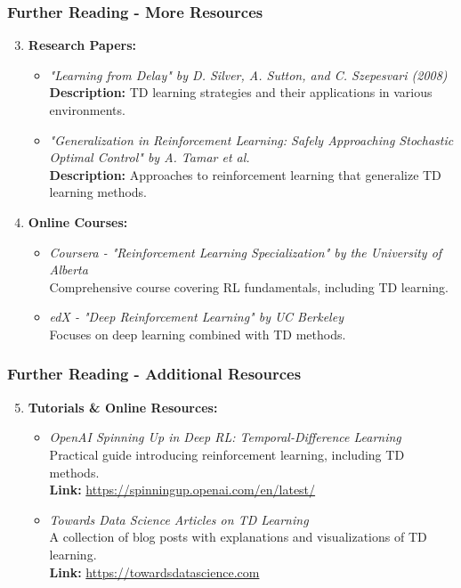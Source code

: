 \documentclass[aspectratio=169]{beamer}
\begin{document}
\begin{frame}[fragile]
    \frametitle{Further Reading - More Resources}
    \begin{enumerate}
        \setcounter{enumi}{2}
        \item \textbf{Research Papers:}
        \begin{itemize}
            \item \textit{"Learning from Delay" by D. Silver, A. Sutton, and C. Szepesvari (2008)}\\
            \textbf{Description:} TD learning strategies and their applications in various environments.
            
            \item \textit{"Generalization in Reinforcement Learning: Safely Approaching Stochastic Optimal Control" by A. Tamar et al.}\\
            \textbf{Description:} Approaches to reinforcement learning that generalize TD learning methods.
        \end{itemize}
        \item \textbf{Online Courses:}
        \begin{itemize}
            \item \textit{Coursera - "Reinforcement Learning Specialization" by the University of Alberta}\\
            Comprehensive course covering RL fundamentals, including TD learning.
            
            \item \textit{edX - "Deep Reinforcement Learning" by UC Berkeley}\\
            Focuses on deep learning combined with TD methods.
        \end{itemize}
    \end{enumerate}
\end{frame}

\begin{frame}[fragile]
    \frametitle{Further Reading - Additional Resources}
    \begin{enumerate}
        \setcounter{enumi}{4}
        \item \textbf{Tutorials \& Online Resources:}
        \begin{itemize}
            \item \textit{OpenAI Spinning Up in Deep RL: Temporal-Difference Learning}\\
            Practical guide introducing reinforcement learning, including TD methods.\\
            \textbf{Link:} \url{https://spinningup.openai.com/en/latest/}
            
            \item \textit{Towards Data Science Articles on TD Learning}\\
            A collection of blog posts with explanations and visualizations of TD learning.\\
            \textbf{Link:} \url{https://towardsdatascience.com}
        \end{itemize}
    \end{enumerate}
\end{frame}
\end{document}
